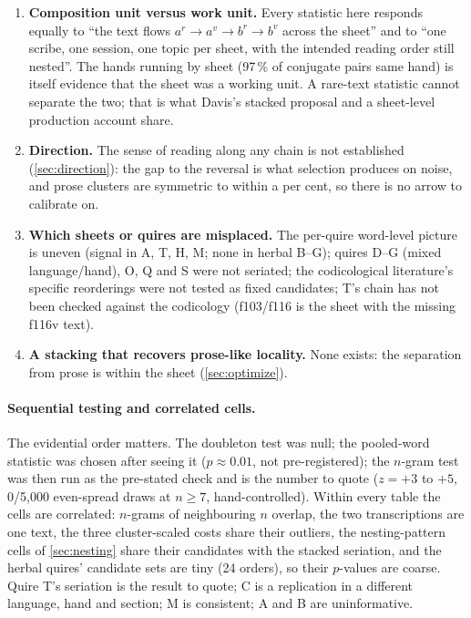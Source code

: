 \documentclass[11pt,a4paper]{article}
\begin{document}
\begin{notestablished}
\begin{enumerate}
\item \textbf{Composition unit versus work unit.} Every statistic here responds equally to ``the text flows $a^r\to a^v\to b^r\to b^v$ across the sheet'' and to ``one scribe, one session, one topic per sheet, with the intended reading order still nested''. The hands running by sheet (97\,\% of conjugate pairs same hand) is itself evidence that the sheet was a working unit. A rare-text statistic cannot separate the two; that is what Davis's stacked proposal and a sheet-level production account share.
\item \textbf{Direction.} The sense of reading along any chain is not established (\cref{sec:direction}): the gap to the reversal is what selection produces on noise, and prose clusters are symmetric to within a per cent, so there is no arrow to calibrate on.
\item \textbf{Which sheets or quires are misplaced.} The per-quire word-level picture is uneven (signal in A, T, H, M; none in herbal B--G); quires D--G (mixed language/hand), O, Q and S were not seriated; the codicological literature's specific reorderings were not tested as fixed candidates; T's chain has not been checked against the codicology (f103/f116 is the sheet with the missing f116v text).
\item \textbf{A stacking that recovers prose-like locality.} None exists: the separation from prose is within the sheet (\cref{sec:optimize}).
\end{enumerate}
\end{notestablished}

\paragraph{Sequential testing and correlated cells.} The evidential order matters. The doubleton test was null; the pooled-word statistic was chosen after seeing it ($p\approx0.01$, not pre-registered); the $n$-gram test was then run as the pre-stated check and is the number to quote ($z=+3$ to $+5$, 0/5,000 even-spread draws at $n\ge7$, hand-controlled). Within every table the cells are correlated: $n$-grams of neighbouring $n$ overlap, the two transcriptions are one text, the three cluster-scaled costs share their outliers, the nesting-pattern cells of \cref{sec:nesting} share their candidates with the stacked seriation, and the herbal quires' candidate sets are tiny (24 orders), so their $p$-values are coarse. Quire T's seriation is the result to quote; C is a replication in a different language, hand and section; M is consistent; A and B are uninformative.
\end{document}
